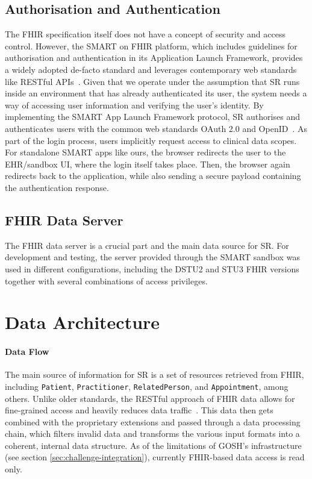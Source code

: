 \documentclass[sigconf]{acmart}
\begin{document}
\subsection{Authorisation and Authentication}
\label{sec:auth}

The FHIR specification itself does not have a concept of security and access control. However, the SMART on FHIR platform, which includes guidelines for authorisation and authentication in its Application Launch Framework, provides a widely adopted de-facto standard and leverages contemporary web standards like RESTful APIs~\cite{smart-on-fhir}. 
Given that we operate under the assumption that SR runs inside an environment that has already authenticated its user, the system needs a way of accessing user information and verifying the user's identity. By implementing the SMART App Launch Framework protocol, SR authorises and authenticates users with the common web standards OAuth 2.0 and OpenID~\cite{smart-launch-framework}. As part of the login process, users implicitly request access to clinical data scopes. For standalone SMART apps like ours, the browser redirects the user to the EHR/sandbox UI, where the login itself takes place. Then, the browser again redirects back to the application, while also sending a secure payload containing the authentication response.


\subsection{FHIR Data Server}

The FHIR data server is a crucial part and the main data source for SR. For development and testing, the server provided through the SMART sandbox was used in different configurations, including the DSTU2 and STU3 FHIR versions together with several combinations of access privileges.


\section{Data Architecture}
\label{sec:data-architecture}

\paragraph{Data Flow}

The main source of information for SR is a set of resources retrieved from FHIR, including \texttt{Patient}, \texttt{Practitioner}, \texttt{RelatedPerson}, and \texttt{Appointment}, among others. Unlike older standards, the RESTful approach of FHIR data allows for fine-grained access and heavily reduces data traffic~\cite{franz2015applying}. This data then gets combined with the proprietary extensions and passed through a data processing chain, which filters invalid data and transforms the various input formats into a coherent, internal data structure. As of the limitations of GOSH's infrastructure (see section \ref{sec:challenge-integration}), currently FHIR-based data access is read only.
\end{document}
